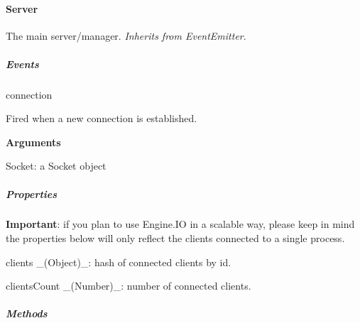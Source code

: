 ~\newline


\paragraph*{Server}

The main server/manager. {\itshape Inherits from Event\+Emitter}.

\subparagraph*{Events}


\begin{DoxyItemize}
\item {\ttfamily connection}
\begin{DoxyItemize}
\item Fired when a new connection is established.
\item {\bfseries Arguments}
\begin{DoxyItemize}
\item {\ttfamily Socket}\+: a Socket object
\end{DoxyItemize}
\end{DoxyItemize}
\end{DoxyItemize}

\subparagraph*{Properties}

{\bfseries Important}\+: if you plan to use Engine.\+IO in a scalable way, please keep in mind the properties below will only reflect the clients connected to a single process.


\begin{DoxyItemize}
\item {\ttfamily clients} \+\_\+(\+Object)\+\_\+\+: hash of connected clients by id.
\item {\ttfamily clients\+Count} \+\_\+(\+Number)\+\_\+\+: number of connected clients.
\end{DoxyItemize}

\subparagraph*{Methods}


